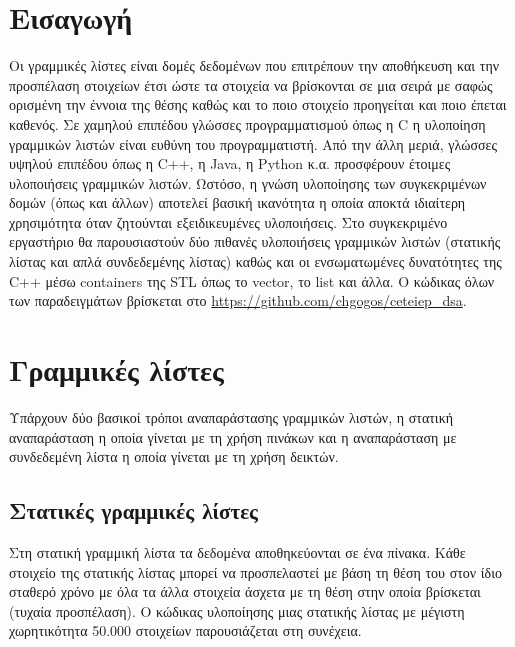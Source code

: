 \section{Εισαγωγή}
Οι γραμμικές λίστες είναι δομές δεδομένων που επιτρέπουν την αποθήκευση και την προσπέλαση στοιχείων έτσι ώστε τα στοιχεία να βρίσκονται σε μια σειρά με σαφώς ορισμένη την έννοια της θέσης καθώς και το ποιο στοιχείο προηγείται και ποιο έπεται καθενός. Σε χαμηλού επιπέδου γλώσσες προγραμματισμού όπως η C η υλοποίηση γραμμικών λιστών είναι ευθύνη του προγραμματιστή. Από την άλλη μεριά, γλώσσες υψηλού επιπέδου όπως η C++, η Java, η Python κ.α. προσφέρουν έτοιμες υλοποιήσεις γραμμικών λιστών. Ωστόσο, η γνώση υλοποίησης των συγκεκριμένων δομών (όπως και άλλων) αποτελεί βασική ικανότητα η οποία αποκτά ιδιαίτερη χρησιμότητα όταν ζητούνται εξειδικευμένες υλοποιήσεις. Στο συγκεκριμένο εργαστήριο θα παρουσιαστούν δύο πιθανές υλοποιήσεις γραμμικών λιστών (στατικής λίστας και απλά συνδεδεμένης λίστας) καθώς και οι ενσωματωμένες δυνατότητες της C++ μέσω containers της STL όπως το vector, το list και άλλα. Ο κώδικας όλων των παραδειγμάτων βρίσκεται στο \href{https://github.com/chgogos/ceteiep_dsa}{https://github.com/chgogos/ceteiep\_dsa}.

\section{Γραμμικές λίστες}
Υπάρχουν δύο βασικοί τρόποι αναπαράστασης γραμμικών λιστών, η στατική αναπαράσταση η οποία γίνεται με τη χρήση πινάκων και η αναπαράσταση με συνδεδεμένη λίστα η οποία γίνεται με τη χρήση δεικτών. 

\subsection{Στατικές γραμμικές λίστες}
Στη στατική γραμμική λίστα τα δεδομένα αποθηκεύονται σε ένα πίνακα. Κάθε στοιχείο της στατικής λίστας μπορεί να προσπελαστεί με βάση τη θέση του στον ίδιο σταθερό χρόνο με όλα τα άλλα στοιχεία άσχετα με τη θέση στην οποία βρίσκεται (τυχαία προσπέλαση). Ο κώδικας υλοποίησης μιας στατικής λίστας με μέγιστη χωρητικότητα 50.000 στοιχείων παρουσιάζεται στη συνέχεια.





